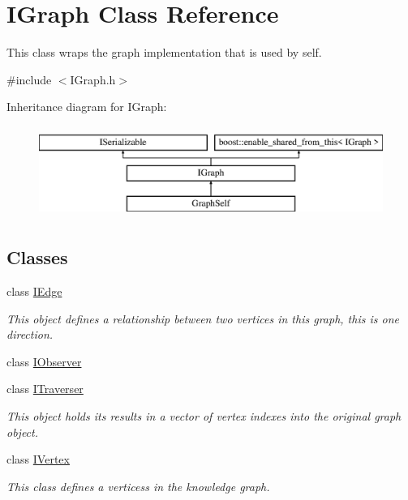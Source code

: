 \hypertarget{class_i_graph}{}\section{I\+Graph Class Reference}
\label{class_i_graph}


This class wraps the graph implementation that is used by self.  




{\ttfamily \#include $<$I\+Graph.\+h$>$}

Inheritance diagram for I\+Graph\+:\begin{figure}[H]
\begin{center}
\leavevmode
\includegraphics[height=3.000000cm]{class_i_graph}
\end{center}
\end{figure}
\subsection*{Classes}
\begin{DoxyCompactItemize}
\item 
class \hyperlink{class_i_graph_1_1_i_edge}{I\+Edge}
\begin{DoxyCompactList}\small\item\em This object defines a relationship between two vertices in this graph, this is one direction. \end{DoxyCompactList}\item 
class \hyperlink{class_i_graph_1_1_i_observer}{I\+Observer}
\item 
class \hyperlink{class_i_graph_1_1_i_traverser}{I\+Traverser}
\begin{DoxyCompactList}\small\item\em This object holds it\textquotesingle{}s results in a vector of vertex indexes into the original graph object. \end{DoxyCompactList}\item 
class \hyperlink{class_i_graph_1_1_i_vertex}{I\+Vertex}
\begin{DoxyCompactList}\small\item\em This class defines a vertices\textquotesingle{}s in the knowledge graph. \end{DoxyCompactList}\end{DoxyCompactItemize}
